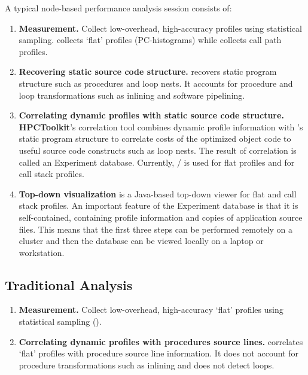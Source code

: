 \documentclass[english]{article}
\begin{document}
A typical node-based performance analysis session consists of:
\begin{enumerate}
\item \textbf{Measurement.}  
Collect low-overhead, high-accuracy profiles using statistical sampling.
 collects `flat' profiles (PC-histograms) while  collects call path profiles.

\item \textbf{Recovering static source code structure.} 
 recovers static program structure such as procedures and loop nests.
It accounts for procedure and loop transformations such as inlining and software pipelining.

\item \textbf{Correlating dynamic profiles with static source code structure.} 
\textbf{HPCToolkit}'s correlation tool combines dynamic profile information with 's static program structure to correlate costs of the optimized object code to useful source code constructs such as loop nests.
The result of correlation is called an Experiment database.
Currently, / is used for flat profiles and  for call stack profiles.

\item \textbf{Top-down visualization}
 is a Java-based top-down viewer for flat and call stack profiles.
An important feature of the Experiment database is that it is self-contained, containing profile information and copies of application source files.
This means that the first three steps can be performed remotely on a cluster and then the database can be viewed locally on a laptop or workstation.
\end{enumerate}

\subsection{Traditional Analysis}

\begin{enumerate}
\item \textbf{Measurement.}  
Collect low-overhead, high-accuracy `flat' profiles using statistical sampling ().

\item \textbf{Correlating dynamic profiles with procedures source lines.} 
 correlates `flat' profiles with procedure source line information.
It does not account for procedure transformations such as inlining and does not detect loops.
\end{enumerate}
\end{document}
